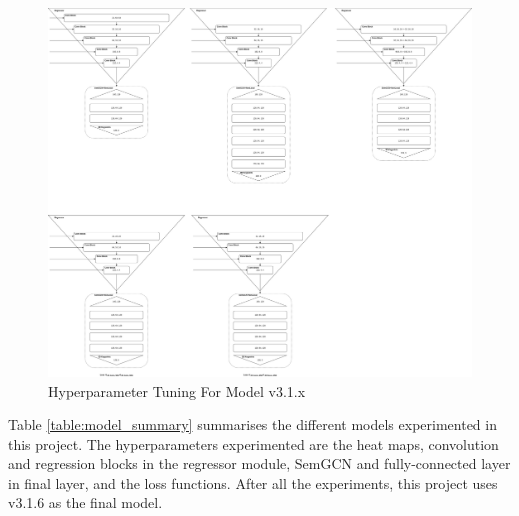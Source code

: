 \begin{figure}[ht]
	\begin{center}
		\includegraphics[width=450px]{assets/Model_v3.1.x.jpg}
		\caption{Hyperparameter Tuning For Model v3.1.x}
		\label{fig:model_v3_1_x}
	\end{center}
\end{figure}

\newpage
\noindent
Table \ref{table:model_summary} summarises the different models experimented in this project. The hyperparameters experimented are the heat maps, convolution and regression blocks in the regressor module, SemGCN and fully-connected layer in final layer, and the loss functions. After all the experiments, this project uses v3.1.6 as the final model.

